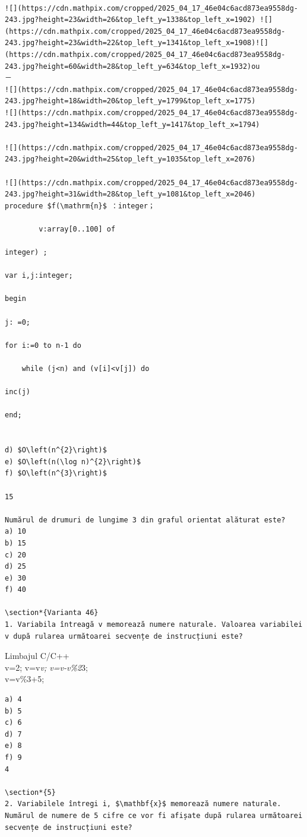 \documentclass[10pt]{article}
\begin{document}
\begin{verbatim}
    
![](https://cdn.mathpix.com/cropped/2025_04_17_46e04c6acd873ea9558dg-243.jpg?height=23&width=26&top_left_y=1338&top_left_x=1902) ![](https://cdn.mathpix.com/cropped/2025_04_17_46e04c6acd873ea9558dg-243.jpg?height=23&width=22&top_left_y=1341&top_left_x=1908)![](https://cdn.mathpix.com/cropped/2025_04_17_46e04c6acd873ea9558dg-243.jpg?height=60&width=28&top_left_y=634&top_left_x=1932)ou
－
![](https://cdn.mathpix.com/cropped/2025_04_17_46e04c6acd873ea9558dg-243.jpg?height=18&width=20&top_left_y=1799&top_left_x=1775)
![](https://cdn.mathpix.com/cropped/2025_04_17_46e04c6acd873ea9558dg-243.jpg?height=134&width=44&top_left_y=1417&top_left_x=1794)

![](https://cdn.mathpix.com/cropped/2025_04_17_46e04c6acd873ea9558dg-243.jpg?height=20&width=25&top_left_y=1035&top_left_x=2076)

![](https://cdn.mathpix.com/cropped/2025_04_17_46e04c6acd873ea9558dg-243.jpg?height=31&width=28&top_left_y=1081&top_left_x=2046)
procedure $f(\mathrm{n}$ ：integer；

        v:array[0..100] of

integer) ;

var i,j:integer;

begin

j: =0;

for i:=0 to n-1 do

    while (j<n) and (v[i]<v[j]) do

inc(j)

end;


d) $O\left(n^{2}\right)$
e) $O\left(n(\log n)^{2}\right)$
f) $O\left(n^{3}\right)$

15

Numărul de drumuri de lungime 3 din graful orientat alăturat este?
a) 10
b) 15
c) 20
d) 25
e) 30
f) 40

\section*{Varianta 46}
1. Variabila întreagă v memorează numere naturale. Valoarea variabilei v după rularea următoarei secvențe de instrucțiuni este?
\end{verbatim}

Limbajul C/C++\\
v=2; v=v\textit{v; v=v-v\%2}3;\\
v=v\%3+5;

\begin{verbatim}
a) 4
b) 5
c) 6
d) 7
e) 8
f) 9
4

\section*{5}
2. Variabilele întregi i, $\mathbf{x}$ memorează numere naturale. Numărul de numere de 5 cifre ce vor fi afișate după rularea următoarei secvențe de instrucțiuni este?
\end{verbatim}
\end{document}
